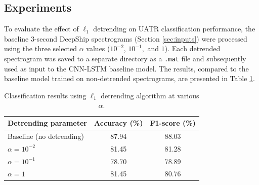 \subsection{Experiments}

To evaluate the effect of $\ell_1$ detrending on UATR classification performance, the baseline 3-second DeepShip spectrograms (Section \ref{sec:inputs}) were processed using the three selected $\alpha$ values ($10^{-2}$, $10^{-1},$ and $1$). Each detrended spectrogram was saved to a separate directory as a \texttt{.mat} file and subsequently used as input to the CNN-LSTM baseline model. The results, compared to the baseline model trained on non-detrended spectrograms, are presented in Table \ref{tab:detrend-results-3s}.

\begin{table}[htbp]
    \centering
    \begin{tabular}{lcc}
        \toprule
        \textbf{Detrending parameter} & \textbf{Accuracy (\%)} & \textbf{F1-score (\%)} \\ \midrule
        Baseline (no detrending)      & 87.94 & 88.03 \\
        $\alpha = 10^{-2}$            & 81.45 & 81.28 \\
        $\alpha = 10^{-1}$            & 78.70 & 78.89 \\
        $\alpha = 1$                  & 81.45 & 80.76 \\
        \bottomrule
    \end{tabular}
    \caption{Classification results using $\ell_1$ detrending algorithm at various $\alpha$.}
    \label{tab:detrend-results-3s}
\end{table}

